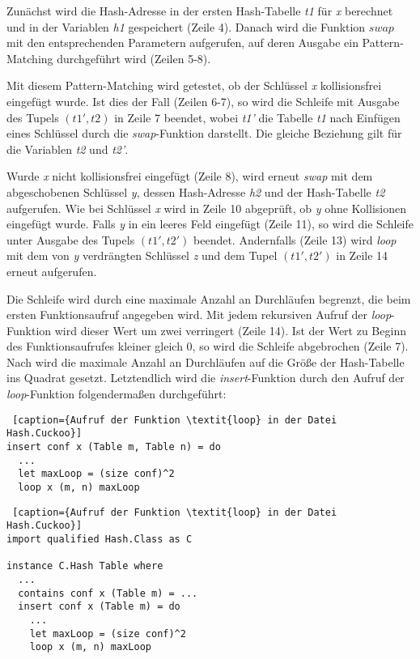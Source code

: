 Zunächst wird die Hash-Adresse in der ersten Hash-Tabelle \textit{t1} für \textit{x} berechnet und in der Variablen \textit{h1} gespeichert (Zeile 4). Danach wird die Funktion \(swap\) mit den entsprechenden Parametern aufgerufen, auf deren Ausgabe ein Pattern-Matching durchgeführt wird (Zeilen 5-8). 

Mit diesem Pattern-Matching wird getestet, ob der Schlüssel \textit{x} kollisionsfrei eingefügt wurde. Ist dies der Fall (Zeilen 6-7), so wird die Schleife mit Ausgabe des Tupels \((t1', t2)\) in Zeile 7 beendet, wobei \textit{t1'} die Tabelle \textit{t1} nach Einfügen eines Schlüssel durch die \textit{swap}-Funktion darstellt. Die gleiche Beziehung gilt für die Variablen \textit{t2} und \textit{t2'}. 

Wurde \textit{x} nicht kollisionsfrei eingefügt (Zeile 8), wird erneut \textit{swap} mit dem abgeschobenen Schlüssel \textit{y}, dessen Hash-Adresse \textit{h2} und der Hash-Tabelle \textit{t2} aufgerufen. Wie bei Schlüssel \textit{x} wird in Zeile 10 abgeprüft, ob \textit{y} ohne Kollisionen eingefügt wurde. Falls \textit{y} in ein leeres Feld eingefügt (Zeile 11), so wird die Schleife unter Ausgabe des Tupels \((t1', t2')\) beendet. Andernfalls (Zeile 13) wird \textit{loop} mit dem von \textit{y} verdrängten Schlüssel \textit{z} und dem Tupel \((t1', t2')\) in Zeile 14 erneut aufgerufen. 

Die Schleife wird durch eine maximale Anzahl an Durchläufen begrenzt, die beim ersten Funktionsaufruf angegeben wird. Mit jedem rekursiven Aufruf der \textit{loop}-Funktion wird dieser Wert um zwei verringert (Zeile 14). Ist der Wert zu Beginn des Funktionsaufrufes kleiner gleich 0, so wird die Schleife abgebrochen (Zeile 7). Nach \cite[S.~5]{ADScuckoo} wird die maximale Anzahl an Durchläufen auf die Größe der Hash-Tabelle ins Quadrat gesetzt. Letztendlich wird die \textit{insert}-Funktion durch den Aufruf der \textit{loop}-Funktion folgendermaßen durchgeführt:
\begin{lstlisting} [caption={Aufruf der Funktion \textit{loop} in der Datei Hash.Cuckoo}]
insert conf x (Table m, Table n) = do
  ...
  let maxLoop = (size conf)^2
  loop x (m, n) maxLoop
\end{lstlisting}
\newpage
\begin{lstlisting} [caption={Aufruf der Funktion \textit{loop} in der Datei Hash.Cuckoo}]
import qualified Hash.Class as C

instance C.Hash Table where
  ...
  contains conf x (Table m) = ...
  insert conf x (Table m) = do
    ...
    let maxLoop = (size conf)^2
    loop x (m, n) maxLoop
\end{lstlisting}